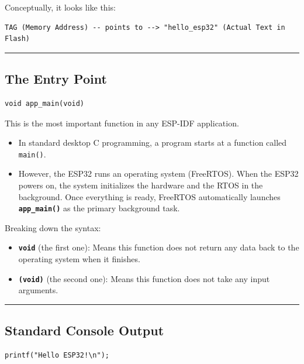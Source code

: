 \documentclass[11pt]{article}
\begin{document}
Conceptually, it looks like this:

\begin{verbatim}
TAG (Memory Address) -- points to --> "hello_esp32" (Actual Text in Flash)
\end{verbatim}

\bigskip
\noindent\rule{\textwidth}{0.4pt}
\bigskip

\subsection*{ The Entry Point}

\begin{verbatim}
void app_main(void)
\end{verbatim}

This is the most important function in any ESP-IDF application.

\begin{itemize}
    \item In standard desktop C programming, a program starts at a function called \texttt{main()}.
    
    \item However, the ESP32 runs an operating system (FreeRTOS). When the ESP32 powers on, the system initializes the hardware and the RTOS in the background. Once everything is ready, FreeRTOS automatically launches \textbf{\texttt{app\_main()}} as the primary background task.
\end{itemize}

Breaking down the syntax:

\begin{itemize}
    \item \textbf{\texttt{void}} (the first one): Means this function does not return any data back to the operating system when it finishes.
    
    \item \textbf{\texttt{(void)}} (the second one): Means this function does not take any input arguments.
\end{itemize}

\bigskip
\noindent\rule{\textwidth}{0.4pt}
\bigskip

\subsection*{ Standard Console Output}

\begin{verbatim}
printf("Hello ESP32!\n");
\end{verbatim}
\end{document}
